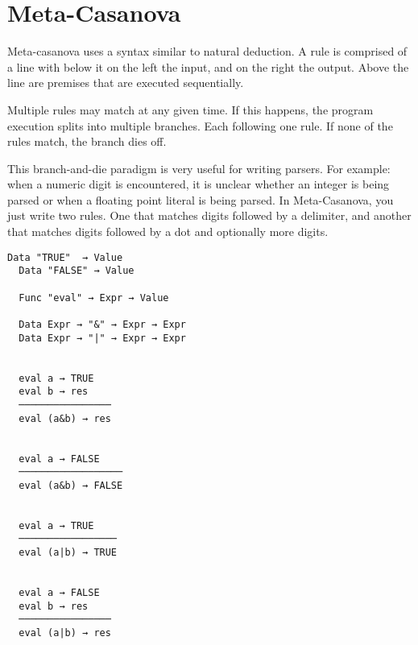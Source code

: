 \section*{Meta-Casanova}
\begin{multicols}{2}
  Meta-casanova uses a syntax similar to natural deduction.
  A rule is comprised of a line with below it on the left the input, and on the right the output.
  Above the line are premises that are executed sequentially.

  Multiple rules may match at any given time.
  If this happens, the program execution splits into multiple branches.
  Each following one rule.
  If none of the rules match, the branch dies off. 
  
  This branch-and-die paradigm is very useful for writing parsers.
  For example: when a numeric digit is encountered, it is unclear whether an integer is being parsed or when a floating point literal is being parsed. 
  In Meta-Casanova, you just write two rules. One that matches digits followed by a delimiter, and another that matches digits followed by a dot and optionally more digits.
\columnbreak
\begin{lstlisting}[caption=A Boolean expression interpreter in Meta-Casanova.]
  Data "TRUE"  → Value
  Data "FALSE" → Value

  Func "eval" → Expr → Value

  Data Expr → "&" → Expr → Expr
  Data Expr → "|" → Expr → Expr


  eval a → TRUE
  eval b → res
  ────────────────
  eval (a&b) → res
  

  eval a → FALSE
  ──────────────────
  eval (a&b) → FALSE
 

  eval a → TRUE
  ─────────────────
  eval (a|b) → TRUE


  eval a → FALSE
  eval b → res
  ────────────────
  eval (a|b) → res
\end{lstlisting}

\end{multicols}
